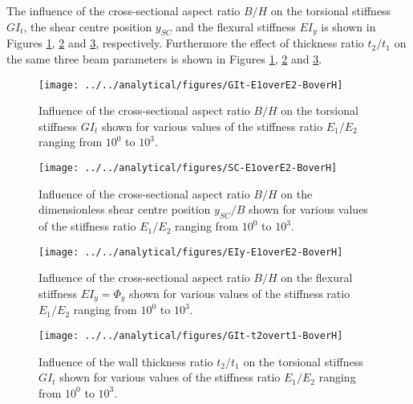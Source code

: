 The influence of the cross-sectional aspect ratio $B/H$ on the torsional stiffness $G I_t$, the shear centre position $y_{SC}$ and the flexural stiffness $E I_y$ is shown in Figures \ref{fig:GIt-E1overE2-BoverH}, \ref{fig:SC-E1overE2-BoverH} and \ref{fig:EIy-E1overE2-BoverH}, respectively. Furthermore the effect of thickness ratio $t_2/t_1$ on the same three beam parameters is shown in Figures \ref{fig:GIt-E1overE2-BoverH}, \ref{fig:SC-E1overE2-BoverH} and \ref{fig:EIy-E1overE2-BoverH}. 

\begin{figure}[!htpb] %
  \centering
  \texttt{[image: ../../analytical/figures/GIt-E1overE2-BoverH]}
  \caption[Influence of the cross-sectional aspect ratio $B/H$ on the torsional stiffness $GI_t$]{Influence of the cross-sectional aspect ratio $B/H$ on the torsional stiffness $GI_t$ shown for various values of the stiffness ratio $E_1/E_2$ ranging from $10^0$ to $10^3$. }\label{fig:GIt-E1overE2-BoverH}
\end{figure}

\begin{figure}[!htpb] %
  \centering
  \texttt{[image: ../../analytical/figures/SC-E1overE2-BoverH]}
  \caption[Influence of the cross-sectional aspect ratio $B/H$ on the dimensionless shear centre position $y_{SC}/B$]{Influence of the cross-sectional aspect ratio $B/H$ on the dimensionless shear centre position $y_{SC}/B$ shown for various values of the stiffness ratio $E_1/E_2$ ranging from $10^0$ to $10^3$. }\label{fig:SC-E1overE2-BoverH}
\end{figure}

\begin{figure}[!htpb] %
  \centering
  \texttt{[image: ../../analytical/figures/EIy-E1overE2-BoverH]}
  \caption[Influence of the cross-sectional aspect ratio $B/H$ on the flexural stiffness $EI_y$]{Influence of the cross-sectional aspect ratio $B/H$ on the flexural stiffness $EI_y = \Phi_y$ shown for various values of the stiffness ratio $E_1/E_2$ ranging from $10^0$ to $10^3$. }\label{fig:EIy-E1overE2-BoverH}
\end{figure}

\begin{figure}[!htpb] %
  \centering
  \texttt{[image: ../../analytical/figures/GIt-t2overt1-BoverH]}
  \caption[Influence of the wall thickness ratio $t_2/t_1$ on the torsional stiffness $GI_t$]{Influence of the wall thickness ratio $t_2/t_1$ on the torsional stiffness $GI_t$ shown for various values of the stiffness ratio $E_1/E_2$ ranging from $10^0$ to $10^3$. }\label{fig:GIt-t2overt1-BoverH}
\end{figure}

